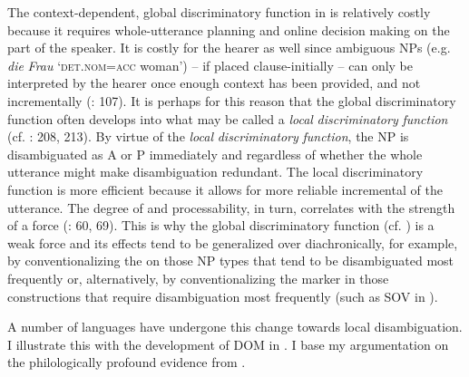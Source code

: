 \documentclass[output=paper]{langsci/langscibook}
\begin{document}
The context-dependent, global discriminatory function in  is relatively costly because it requires whole-utterance planning and online decision making on the part of the speaker. It is costly for the hearer as well since ambiguous NPs (e.g.  \textit{die} \textit{Frau} ‘\textsc{det.nom=acc} woman’) – if placed clause-initially – can only be interpreted by the hearer once enough context has been provided, and not incrementally (\citealt{Bornkessel-SchlesewskySchlesewsky2014}: 107). It is perhaps for this reason that the global discriminatory function often develops into what may be called a \textit{local} \textit{discriminatory} \textit{function} (cf. \citealt{Aissen2003,ZeevatJäger2002,Jäger2004,Malchukov2008}: 208, 213). By virtue of the \textit{local} \textit{discriminatory} \textit{function}, the NP is disambiguated as A or P immediately and regardless of whether the whole utterance might make disambiguation redundant. The local discriminatory function is more efficient because it allows for more reliable incremental  of the utterance. The degree of  and processability, in turn, correlates with the strength of a force (\citealt{Hawkins2014_CompMot}: 60, 69). This is why the global discriminatory function (cf. ) is a weak force and its effects tend to be generalized over diachronically, for example, by conventionalizing the  on those NP types that tend to be disambiguated most frequently or, alternatively, by conventionalizing the marker in those constructions that require disambiguation most frequently (such as SOV in ). 

A number of languages have undergone this change towards local disambiguation. I illustrate this with the development of DOM in . I base my argumentation on the philologically profound evidence from \citet{Krysko1994_Russ,Krysko1997_Russ}. 
\end{document}

